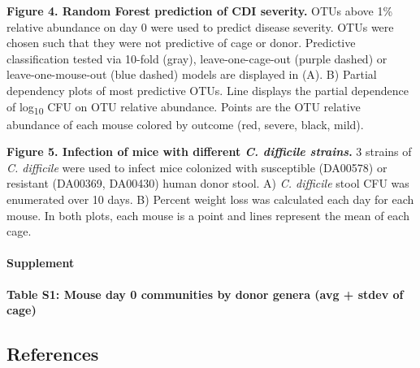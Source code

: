 \documentclass[]{article}
\begin{document}
\textbf{Figure 4. Random Forest prediction of CDI severity.} OTUs above
1\% relative abundance on day 0 were used to predict disease severity.
OTUs were chosen such that they were not predictive of cage or donor.
Predictive classification tested via 10-fold (gray), leave-one-cage-out
(purple dashed) or leave-one-mouse-out (blue dashed) models are
displayed in (A). B) Partial dependency plots of most predictive OTUs.
Line displays the partial dependence of log\textsubscript{10} CFU on OTU
relative abundance. Points are the OTU relative abundance of each mouse
colored by outcome (red, severe, black, mild).

\textbf{Figure 5. Infection of mice with different \emph{C. difficile
strains}.} 3 strains of \emph{C. difficile} were used to infect mice
colonized with susceptible (DA00578) or resistant (DA00369, DA00430)
human donor stool. A) \emph{C. difficile} stool CFU was enumerated over
10 days. B) Percent weight loss was calculated each day for each mouse.
In both plots, each mouse is a point and lines represent the mean of
each cage.

\paragraph{Supplement}\label{supplement}

\textbf{Table S1: Mouse day 0 communities by donor genera (avg + stdev
of cage)}

\newpage

\subsection{References}\label{references}
\end{document}
